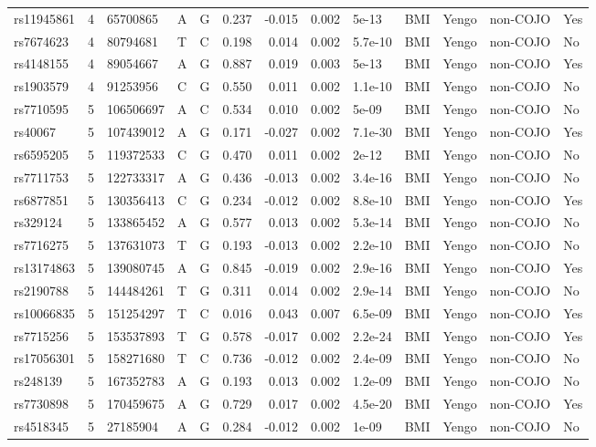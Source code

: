 \documentclass[11pt,twoside]{bristolthesis}
\begin{document}
\begin{longtable}[t]{lrlllrrrlllll}
rs11945861 & 4 & 65700865 & A & G & 0.237 & -0.015 & 0.002 & 5e-13 & BMI & Yengo & non-COJO & Yes\\
rs7674623 & 4 & 80794681 & T & C & 0.198 & 0.014 & 0.002 & 5.7e-10 & BMI & Yengo & non-COJO & No\\
rs4148155 & 4 & 89054667 & A & G & 0.887 & 0.019 & 0.003 & 5e-13 & BMI & Yengo & non-COJO & Yes\\
\addlinespace
rs1903579 & 4 & 91253956 & C & G & 0.550 & 0.011 & 0.002 & 1.1e-10 & BMI & Yengo & non-COJO & No\\
rs7710595 & 5 & 106506697 & A & C & 0.534 & 0.010 & 0.002 & 5e-09 & BMI & Yengo & non-COJO & No\\
rs40067 & 5 & 107439012 & A & G & 0.171 & -0.027 & 0.002 & 7.1e-30 & BMI & Yengo & non-COJO & Yes\\
rs6595205 & 5 & 119372533 & C & G & 0.470 & 0.011 & 0.002 & 2e-12 & BMI & Yengo & non-COJO & No\\
rs7711753 & 5 & 122733317 & A & G & 0.436 & -0.013 & 0.002 & 3.4e-16 & BMI & Yengo & non-COJO & No\\
\addlinespace
rs6877851 & 5 & 130356413 & C & G & 0.234 & -0.012 & 0.002 & 8.8e-10 & BMI & Yengo & non-COJO & Yes\\
rs329124 & 5 & 133865452 & A & G & 0.577 & 0.013 & 0.002 & 5.3e-14 & BMI & Yengo & non-COJO & No\\
rs7716275 & 5 & 137631073 & T & G & 0.193 & -0.013 & 0.002 & 2.2e-10 & BMI & Yengo & non-COJO & No\\
rs13174863 & 5 & 139080745 & A & G & 0.845 & -0.019 & 0.002 & 2.9e-16 & BMI & Yengo & non-COJO & Yes\\
rs2190788 & 5 & 144484261 & T & G & 0.311 & 0.014 & 0.002 & 2.9e-14 & BMI & Yengo & non-COJO & No\\
\addlinespace
rs10066835 & 5 & 151254297 & T & C & 0.016 & 0.043 & 0.007 & 6.5e-09 & BMI & Yengo & non-COJO & Yes\\
rs7715256 & 5 & 153537893 & T & G & 0.578 & -0.017 & 0.002 & 2.2e-24 & BMI & Yengo & non-COJO & Yes\\
rs17056301 & 5 & 158271680 & T & C & 0.736 & -0.012 & 0.002 & 2.4e-09 & BMI & Yengo & non-COJO & No\\
rs248139 & 5 & 167352783 & A & G & 0.193 & 0.013 & 0.002 & 1.2e-09 & BMI & Yengo & non-COJO & No\\
rs7730898 & 5 & 170459675 & A & G & 0.729 & 0.017 & 0.002 & 4.5e-20 & BMI & Yengo & non-COJO & Yes\\
\addlinespace
rs4518345 & 5 & 27185904 & A & G & 0.284 & -0.012 & 0.002 & 1e-09 & BMI & Yengo & non-COJO & No\\

\end{longtable}
\end{document}
